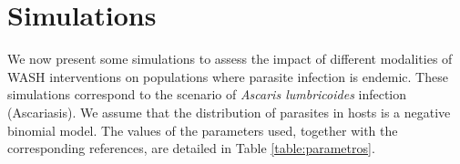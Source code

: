 \documentclass[12pt,a4paper]{article}
\theoremstyle{plain}%
\theoremstyle{definition}
\theoremstyle{remark}
\begin{document}
	\section{Simulations}
	We now present some simulations to assess the impact of different modalities of WASH interventions on populations where parasite infection is endemic.
	These simulations correspond to the scenario of \textit{Ascaris lumbricoides} infection (Ascariasis).
	We assume that the distribution of parasites in hosts is a negative binomial model.
	The values of the parameters used, together with the corresponding references, are detailed in Table \ref{table:parametros}.
\end{document}
